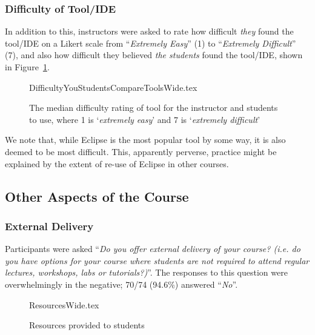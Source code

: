 \documentclass[english,submission]{programming}
\begin{document}
\subsubsection{Difficulty of Tool/IDE}

In addition to this, instructors were asked to rate how difficult
{\emph{they}} found the tool/IDE on a Likert scale from
``{\emph{Extremely Easy}}'' (1) to ``{\emph{Extremely Difficult}}''
(7), and also how difficult they believed {\emph{the students}} found
the tool/IDE, shown in Figure~\ref{fig:toolhard}.

\begin{figure}
\begin{center}
{DifficultyYouStudentsCompareToolsWide.tex}
\end{center}
\caption{The median difficulty rating of tool for the instructor and students to use, where 1 is `{\emph{extremely easy}}' and 7 is `{\emph{extremely difficult}}'  %
\label{fig:toolhard}}
\end{figure}

We note that, while Eclipse is the most popular tool by some way, it
is also deemed to be most difficult. This, apparently perverse,
practice might be explained by the extent of re-use of Eclipse in
other courses.

\subsection{Other Aspects of the Course}

\subsubsection{External Delivery}

Participants were asked ``{\emph{Do you offer external delivery of
your course? (i.e. do you have options for your course where students
are not required to attend regular lectures, workshops, labs or
tutorials?)}}''. The responses to this question were overwhelmingly in
the negative; 70/74 (94.6\%) answered ``{\emph{No}}''.

\begin{figure}
\begin{center}
{ResourcesWide.tex}
\end{center}\vskip-18pt
\caption{Resources provided to students\label{fig:Resources}}
\end{figure}
\end{document}
